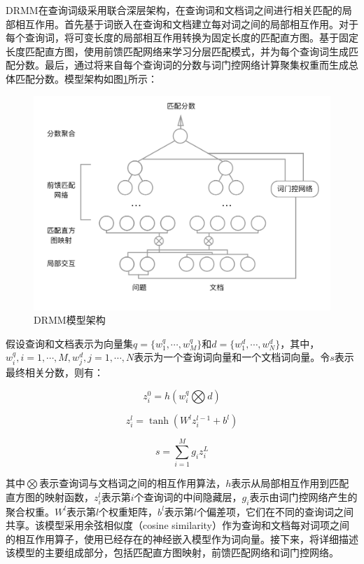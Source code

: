 \documentclass[a4paper]{article}
\begin{document}
DRMM在查询词级采用联合深层架构，在查询词和文档词之间进行相关匹配的局部相互作用。首先基于词嵌入在查询和文档建立每对词之间的局部相互作用。对于每个查询词，将可变长度的局部相互作用转换为固定长度的匹配直方图。基于固定长度匹配直方图，使用前馈匹配网络来学习分层匹配模式，并为每个查询词生成匹配分数。最后，通过将来自每个查询词的分数与词门控网络计算聚集权重而生成总体匹配分数。模型架构如图\ref{fig:drmm}所示：

\begin{figure}[!htbp]\centering
  \includegraphics[width=0.9\linewidth]{DRMM.png}
  \caption{DRMM模型架构} 
  \label{fig:drmm}       %
  \vspace{1em}
\end{figure}

假设查询和文档表示为向量集$q=\{w_1^q, \cdots, w_M^q\}$和$d=\{w_1^d, \cdots, w_N^d\}$，其中，$w_i^q, i=1,\cdots, M, w_j^d, j=1, \cdots, N$表示为一个查询词向量和一个文档词向量。令$s$表示最终相关分数，则有：

\begin{equation}
    z_i^0=h(w_i^q\bigotimes d)
\end{equation}

\begin{equation}
    z_i^l=\tanh(W^lz_i^{l-1}+b^l)
\end{equation}

\begin{equation}
    s=\sum_{i=1}^Mg_iz_i^L
\end{equation}

其中$\bigotimes$表示查询词与文档词之间的相互作用算法，$h$表示从局部相互作用到匹配直方图的映射函数，$z_i^l$表示第$i$个查询词的中间隐藏层，$g_i$表示由词门控网络产生的聚合权重。$W^l$表示第$l$个权重矩阵，$b^l$表示第$l$个偏差项，它们在不同的查询词之间共享。该模型采用余弦相似度（cosine similarity）作为查询和文档每对词项之间的相互作用算子，使用已经存在的神经嵌入模型作为词向量。接下来，将详细描述该模型的主要组成部分，包括匹配直方图映射，前馈匹配网络和词门控网络。
\end{document}

